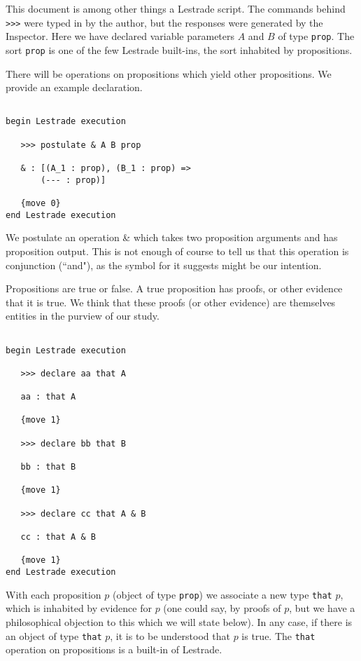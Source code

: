 \documentclass[12pt]{article}
\begin{document}
This document is among other things a Lestrade script.  The commands behind {\tt >>>} were typed in by the author, but the responses were generated by the Inspector.  Here we have declared variable parameters $A$ and $B$ of type {\tt prop}.
The sort {\tt prop} is one of the few Lestrade built-ins, the sort inhabited by propositions.

There will be operations on propositions which yield other propositions.  We provide an example declaration.

\begin{verbatim}

begin Lestrade execution

   >>> postulate & A B prop

   & : [(A_1 : prop), (B_1 : prop) => 
       (--- : prop)]

   {move 0}
end Lestrade execution
\end{verbatim}

We postulate an operation \& which takes two proposition arguments and has proposition output.  This is not enough of course to tell us that this operation is conjunction (``and"), as the symbol for it suggests might be our intention.


Propositions are true or false.  A true proposition has proofs, or other evidence that it is true.  We think that these proofs (or other evidence) are themselves entities in the purview of our study.   

\begin{verbatim}

begin Lestrade execution

   >>> declare aa that A

   aa : that A

   {move 1}

   >>> declare bb that B

   bb : that B

   {move 1}

   >>> declare cc that A & B

   cc : that A & B

   {move 1}
end Lestrade execution

\end{verbatim}

With each proposition $p$ (object of type {\tt prop}) we associate a new type {\tt that} $p$, which is inhabited by evidence for $p$ (one could say, by proofs of $p$, but we have a  philosophical objection to this which we will state below).  In any case, if there is
an object of type {\tt that} $p$, it is to be understood that $p$ is true.  The {\tt that} operation on propositions is a built-in of Lestrade.
\end{document}
